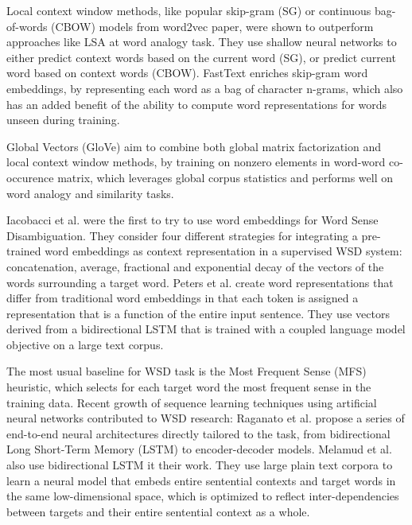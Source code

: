 \documentclass{llncs}
\begin{document}
Local context window methods, like popular skip-gram (SG) or continuous bag-of-words (CBOW) models from word2vec paper\cite{word2vec}, were shown to outperform approaches like LSA at word analogy task.
They use shallow neural networks to either predict context words based on the current word (SG), or predict current word based on context words (CBOW).
FastText\cite{fastText} enriches skip-gram word embeddings, by representing each word as a bag of character n-grams, which also has an added benefit of the ability to compute word representations for words unseen during training.

Global Vectors (GloVe)\cite{GloVe} aim to combine both global matrix factorization and local context window methods, by training on nonzero elements in word-word co-occurence matrix, which leverages global corpus statistics and performs well on word analogy and similarity tasks.

Iacobacci et al.\cite{embeddingsforWSD} were the first to try to use word embeddings for Word Sense Disambiguation.
They consider four different strategies for integrating a pre-trained word embeddings as context representation in a supervised WSD system: concatenation, average, fractional and exponential decay of the vectors of the words surrounding a target word.
Peters et al.\cite{deepcontext} create word representations that differ from traditional word embeddings in that each token is assigned a representation that is a function of the entire input sentence. They use vectors derived from a bidirectional LSTM that is trained with a coupled language model objective on a large text corpus.

The most usual baseline for WSD task is the Most Frequent Sense\cite{evalmfs} (MFS) heuristic, which selects for each target word the most frequent sense in the training data.
Recent growth of sequence learning techniques using artificial neural networks contributed to WSD research: Raganato et al.\cite{neuralseqmodelingforWSD} propose a series of end-to-end neural architectures directly tailored to the task, from bidirectional Long Short-Term Memory (LSTM) to encoder-decoder models.
Melamud et al.\cite{context2vec} also use bidirectional LSTM it their work. They use large plain text corpora to learn a neural model that embeds entire sentential contexts and target words in the same low-dimensional space, which is optimized to reflect inter-dependencies between targets and their entire sentential context as a whole.

\end{document}
